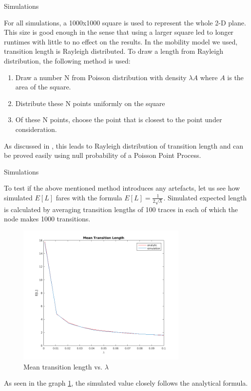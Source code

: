 \documentclass{beamer}
\begin{document}
\begin{frame}{Simulations} {}

For all simulations, a 1000x1000 square is used to represent the whole 2-D plane. This size is good enough in the sense that using a larger square led to longer runtimes with little to no 
effect on the results. In the mobility model we used, transition length is Rayleigh distributed. To draw a length from Rayleigh distribution, the following method is used:

\begin{enumerate}
	\item Draw a number N from Poisson distribution with density $\lambda A$ where $A$ is the area of the square.
	\item Distribute these N points uniformly on the square 
	\item Of these N points, choose the point that is closest to the point under consideration. 
\end{enumerate}

As discussed in \cite{ganti}, this leads to Rayleigh distribution of transition length and can be proved easily using null probability of a Poisson Point Process. 

\end{frame}


\begin{frame}{Simulations} {}

To test if the above mentioned method introduces any artefacts, let us see how simulated $E[L]$ fares with the formula $E[L] = \frac{1}{2\sqrt{\lambda}}$. Simulated expected length is calculated by averaging transition lengths of 100 traces in each of which the node makes 1000 transitions. 
\begin{figure}[h]
	\centering \vspace{-0.1in}
	\includegraphics[width=0.75\textwidth]{images/rwpStat.png}
	\vspace{-20pt} \caption[Mean transition length vs. $\lambda$]{Mean transition length vs. $\lambda$}
	\label{fig:rwpEL}
\end{figure}
As seen in the graph \ref{fig:rwpEL}, the simulated value closely follows the analytical formula.

\end{frame}
\end{document}
